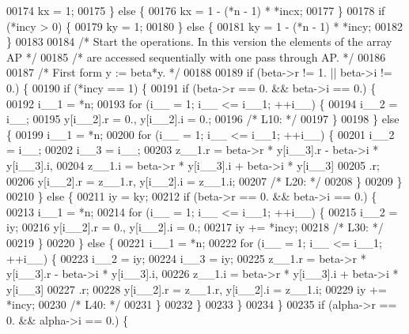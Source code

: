 \begin{DoxyCode}
00174     kx = 1;
00175     \} \textcolor{keywordflow}{else} \{
00176     kx = 1 - (*n - 1) * *incx;
00177     \}
00178     \textcolor{keywordflow}{if} (*incy > 0) \{
00179     ky = 1;
00180     \} \textcolor{keywordflow}{else} \{
00181     ky = 1 - (*n - 1) * *incy;
00182     \}
00183 
00184 \textcolor{comment}{/*     Start the operations. In this version the elements of the array AP */}
00185 \textcolor{comment}{/*     are accessed sequentially with one pass through AP. */}
00186 
00187 \textcolor{comment}{/*     First form  y := beta*y. */}
00188 
00189     \textcolor{keywordflow}{if} (beta->r != 1. || beta->i != 0.) \{
00190     \textcolor{keywordflow}{if} (*incy == 1) \{
00191         \textcolor{keywordflow}{if} (beta->r == 0. && beta->i == 0.) \{
00192         i\_\_1 = *n;
00193         \textcolor{keywordflow}{for} (i\_\_ = 1; i\_\_ <= i\_\_1; ++i\_\_) \{
00194             i\_\_2 = i\_\_;
00195             y[i\_\_2].r = 0., y[i\_\_2].i = 0.;
00196 \textcolor{comment}{/* L10: */}
00197         \}
00198         \} \textcolor{keywordflow}{else} \{
00199         i\_\_1 = *n;
00200         \textcolor{keywordflow}{for} (i\_\_ = 1; i\_\_ <= i\_\_1; ++i\_\_) \{
00201             i\_\_2 = i\_\_;
00202             i\_\_3 = i\_\_;
00203             z\_\_1.r = beta->r * y[i\_\_3].r - beta->i * y[i\_\_3].i, 
00204                 z\_\_1.i = beta->r * y[i\_\_3].i + beta->i * y[i\_\_3]
00205                 .r;
00206             y[i\_\_2].r = z\_\_1.r, y[i\_\_2].i = z\_\_1.i;
00207 \textcolor{comment}{/* L20: */}
00208         \}
00209         \}
00210     \} \textcolor{keywordflow}{else} \{
00211         iy = ky;
00212         \textcolor{keywordflow}{if} (beta->r == 0. && beta->i == 0.) \{
00213         i\_\_1 = *n;
00214         \textcolor{keywordflow}{for} (i\_\_ = 1; i\_\_ <= i\_\_1; ++i\_\_) \{
00215             i\_\_2 = iy;
00216             y[i\_\_2].r = 0., y[i\_\_2].i = 0.;
00217             iy += *incy;
00218 \textcolor{comment}{/* L30: */}
00219         \}
00220         \} \textcolor{keywordflow}{else} \{
00221         i\_\_1 = *n;
00222         \textcolor{keywordflow}{for} (i\_\_ = 1; i\_\_ <= i\_\_1; ++i\_\_) \{
00223             i\_\_2 = iy;
00224             i\_\_3 = iy;
00225             z\_\_1.r = beta->r * y[i\_\_3].r - beta->i * y[i\_\_3].i, 
00226                 z\_\_1.i = beta->r * y[i\_\_3].i + beta->i * y[i\_\_3]
00227                 .r;
00228             y[i\_\_2].r = z\_\_1.r, y[i\_\_2].i = z\_\_1.i;
00229             iy += *incy;
00230 \textcolor{comment}{/* L40: */}
00231         \}
00232         \}
00233     \}
00234     \}
00235     \textcolor{keywordflow}{if} (alpha->r == 0. && alpha->i == 0.) \{

\end{DoxyCode}
